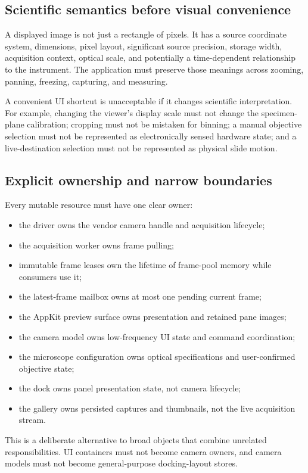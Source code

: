 \documentclass[11pt,a4paper,oneside]{article}
\begin{document}
\subsection{Scientific semantics before visual convenience}
A displayed image is not just a rectangle of pixels. It has a source coordinate system, dimensions, pixel layout, significant source precision, storage width, acquisition context, optical scale, and potentially a time-dependent relationship to the instrument. The application must preserve those meanings across zooming, panning, freezing, capturing, and measuring.

A convenient UI shortcut is unacceptable if it changes scientific interpretation. For example, changing the viewer's display scale must not change the specimen-plane calibration; cropping must not be mistaken for binning; a manual objective selection must not be represented as electronically sensed hardware state; and a live-destination selection must not be represented as physical slide motion.

\subsection{Explicit ownership and narrow boundaries}
Every mutable resource must have one clear owner:
\begin{itemize}
  \item the driver owns the vendor camera handle and acquisition lifecycle;
  \item the acquisition worker owns frame pulling;
  \item immutable frame leases own the lifetime of frame-pool memory while consumers use it;
  \item the latest-frame mailbox owns at most one pending current frame;
  \item the AppKit preview surface owns presentation and retained pane images;
  \item the camera model owns low-frequency UI state and command coordination;
  \item the microscope configuration owns optical specifications and user-confirmed objective state;
  \item the dock owns panel presentation state, not camera lifecycle;
  \item the gallery owns persisted captures and thumbnails, not the live acquisition stream.
\end{itemize}

This is a deliberate alternative to broad objects that combine unrelated responsibilities. UI containers must not become camera owners, and camera models must not become general-purpose docking-layout stores.
\end{document}

